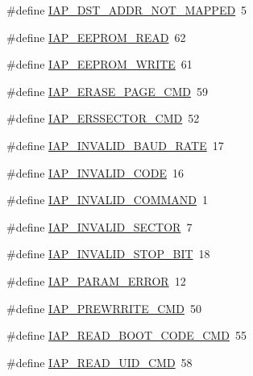 \begin{DoxyCompactItemize}
\item 
\#define \hyperlink{group__COMMON__IAP_gacd5a7fb6c783f5d435e594170757d1d4}{I\+A\+P\+\_\+\+D\+S\+T\+\_\+\+A\+D\+D\+R\+\_\+\+N\+O\+T\+\_\+\+M\+A\+P\+P\+ED}~5
\item 
\#define \hyperlink{group__COMMON__IAP_ga34d721b0a3ff4caf7b847c9d85fe73a0}{I\+A\+P\+\_\+\+E\+E\+P\+R\+O\+M\+\_\+\+R\+E\+AD}~62
\item 
\#define \hyperlink{group__COMMON__IAP_ga76ebaaa7cd2a015246d1a44e3a0cc369}{I\+A\+P\+\_\+\+E\+E\+P\+R\+O\+M\+\_\+\+W\+R\+I\+TE}~61
\item 
\#define \hyperlink{group__COMMON__IAP_ga24604c568e67c76aee924f9439426111}{I\+A\+P\+\_\+\+E\+R\+A\+S\+E\+\_\+\+P\+A\+G\+E\+\_\+\+C\+MD}~59
\item 
\#define \hyperlink{group__COMMON__IAP_gad212cc38d91507366f07f9393e42eaec}{I\+A\+P\+\_\+\+E\+R\+S\+S\+E\+C\+T\+O\+R\+\_\+\+C\+MD}~52
\item 
\#define \hyperlink{group__COMMON__IAP_ga6913ca0660dc1a2cccd8c6b09bcdbc75}{I\+A\+P\+\_\+\+I\+N\+V\+A\+L\+I\+D\+\_\+\+B\+A\+U\+D\+\_\+\+R\+A\+TE}~17
\item 
\#define \hyperlink{group__COMMON__IAP_ga456a8363a47d21d7198056da4b1e9f61}{I\+A\+P\+\_\+\+I\+N\+V\+A\+L\+I\+D\+\_\+\+C\+O\+DE}~16
\item 
\#define \hyperlink{group__COMMON__IAP_ga78fcc8d4b3835576a272431915e39eb7}{I\+A\+P\+\_\+\+I\+N\+V\+A\+L\+I\+D\+\_\+\+C\+O\+M\+M\+A\+ND}~1
\item 
\#define \hyperlink{group__COMMON__IAP_gab3af925b968fb59823d08d77261aebf7}{I\+A\+P\+\_\+\+I\+N\+V\+A\+L\+I\+D\+\_\+\+S\+E\+C\+T\+OR}~7
\item 
\#define \hyperlink{group__COMMON__IAP_ga6c61111082b04ba6780151c83f8c3644}{I\+A\+P\+\_\+\+I\+N\+V\+A\+L\+I\+D\+\_\+\+S\+T\+O\+P\+\_\+\+B\+IT}~18
\item 
\#define \hyperlink{group__COMMON__IAP_ga6bf1bec9cbb419f8006447171e9750b7}{I\+A\+P\+\_\+\+P\+A\+R\+A\+M\+\_\+\+E\+R\+R\+OR}~12
\item 
\#define \hyperlink{group__COMMON__IAP_ga540234bb0f525a06770175699d01063b}{I\+A\+P\+\_\+\+P\+R\+E\+W\+R\+R\+I\+T\+E\+\_\+\+C\+MD}~50
\item 
\#define \hyperlink{group__COMMON__IAP_ga8d0f5e06feea423e15ee0238534f80ea}{I\+A\+P\+\_\+\+R\+E\+A\+D\+\_\+\+B\+O\+O\+T\+\_\+\+C\+O\+D\+E\+\_\+\+C\+MD}~55
\item 
\#define \hyperlink{group__COMMON__IAP_gad2458645f1cf815f56f205bd7f7fd1af}{I\+A\+P\+\_\+\+R\+E\+A\+D\+\_\+\+U\+I\+D\+\_\+\+C\+MD}~58
\item 

\end{DoxyCompactItemize}
